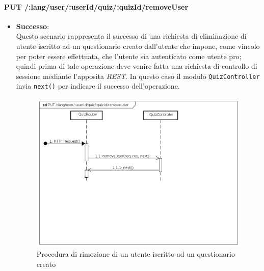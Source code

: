 \paragraph{PUT /:lang/user/:userId/quiz/:quizId/removeUser} %
\begin{itemize}
\item \textbf{Successo}:\\
Questo scenario rappresenta il successo di una richiesta di eliminazione di utente iscritto ad un questionario creato dall'utente che impone, come vincolo per poter essere effettuata, che l'utente sia autenticato come utente pro; quindi prima di tale operazione deve venire fatta una richiesta di controllo di sessione mediante l'apposita \textit{REST}. In questo caso il modulo \texttt{QuizController} invia \texttt{next()} per indicare il successo dell'operazione.
\label{Procedura di rimozione di utente iscritto ad un questionario}
\begin{figure}[ht]
	\centering
	\includegraphics[scale=0.40]{UML/DiagrammiDiSequenza/Back-end/PUT_lang_user__userId_quiz__quizIdRemoveUserSuccess.png}
	\caption{Procedura di rimozione di un utente iscritto ad un questionario creato}
\end{figure}
\FloatBarrier


\end{itemize}
